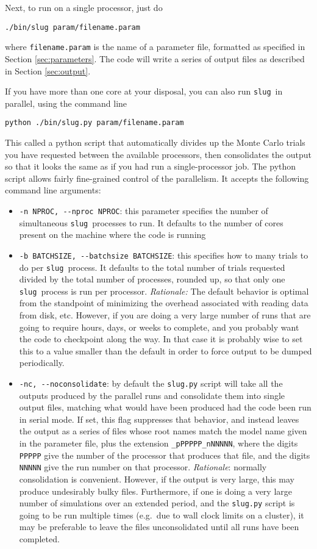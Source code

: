 \documentclass[12pt]{article}
\newcommand{\slug}{\texttt{slug}}
\begin{document}
Next, to run on a single processor, just do
\begin{verbatim}
./bin/slug param/filename.param
\end{verbatim}
where \verb=filename.param= is the name of a parameter file, formatted as specified in Section \ref{sec:parameters}. The code will write a series of output files as described in Section \ref{sec:output}.

If you have more than one core at your disposal, you can also run \slug\ in parallel, using the command line
\begin{verbatim}
python ./bin/slug.py param/filename.param
\end{verbatim}
This called a python script that automatically divides up the Monte Carlo trials you have requested between the available processors, then consolidates the output so that it looks the same as if you had run a single-processor job. The python script allows fairly fine-grained control of the parallelism. It accepts the following command line arguments:
\begin{itemize}
\item \verb=-n NPROC, --nproc NPROC=: this parameter specifies the number of simultaneous \slug\ processes to run. It defaults to the number of cores present on the machine where the code is running
\item \verb=-b BATCHSIZE, --batchsize BATCHSIZE=: this specifies how to many trials to do per \slug\ process. It defaults to the total number of trials requested divided by the total number of processes, rounded up, so that only one \slug\ process is run per processor. \textit{Rationale:} The default behavior is optimal from the standpoint of minimizing the overhead associated with reading data from disk, etc. However, if you are doing a very large number of runs that are going to require hours, days, or weeks to complete, and you probably want the code to checkpoint along the way. In that case it is probably wise to set this to a value smaller than the default in order to force output to be dumped periodically.
\item \verb=-nc, --noconsolidate=: by default the \verb=slug.py= script will take all the outputs produced by the parallel runs and consolidate them into single output files, matching what would have been produced had the code been run in serial mode. If set, this flag suppresses that behavior, and instead leaves the output as a series of files whose root names match the model name given in the parameter file, plus the extension \verb=_pPPPPP_nNNNNN=, where the digits \verb=PPPPP= give the number of the processor that produces that file, and the digits \verb=NNNNN= give the run number on that processor. \textit{Rationale}: normally consolidation is convenient. However, if the output is very large, this may produce undesirably bulky files. Furthermore, if one is doing a very large number of simulations over an extended period, and the \verb=slug.py= script is going to be run multiple times (e.g.\ due to wall clock limits on a cluster), it may be preferable to leave the files unconsolidated until all runs have been completed.
\end{itemize}
\end{document}
